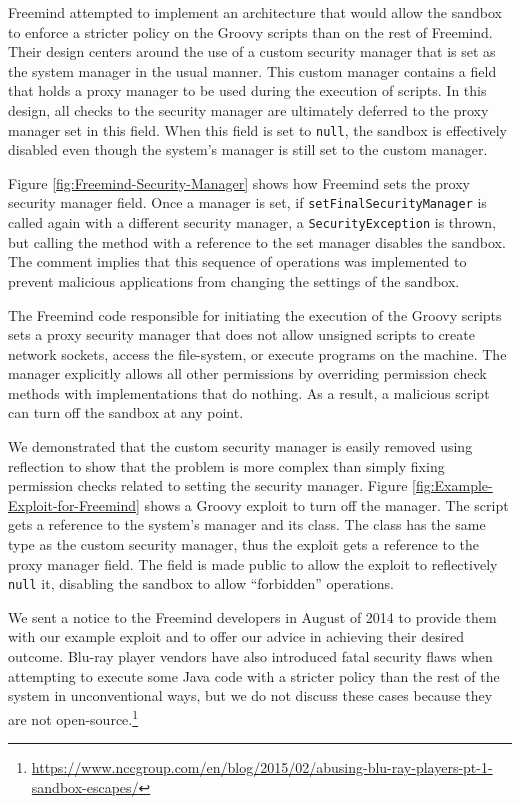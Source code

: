 \documentclass{sig-alternate}
\begin{document}
Freemind attempted to implement an architecture that would allow the
sandbox to enforce a stricter policy on the Groovy scripts than on
the rest of Freemind. Their design centers around the use of a custom
security manager that is set as the system manager in the usual manner.
This custom manager contains a field that holds a proxy manager to be used during the execution of
scripts. In this design, all checks to the security manager are ultimately
deferred to the proxy manager set in this field. When
this field is set to \texttt{null}, the sandbox is effectively disabled
even though the system's manager is still set to the custom manager.

Figure \ref{fig:Freemind-Security-Manager} shows how Freemind sets
the proxy security manager field.
Once a manager is set, if \texttt{setFinalSecurityManager} is called
again with a different security manager, a \texttt{SecurityException}
is thrown, but calling the method with a reference to the set manager disables
the sandbox. The comment implies that this sequence
of operations was implemented to prevent malicious applications from
changing the settings of the sandbox.

The Freemind code responsible for initiating the execution of the
Groovy scripts sets a proxy security manager that does not allow unsigned
scripts to create network sockets, access the file-system, or execute
programs on the machine. The manager explicitly allows all other permissions by overriding permission check methods with implementations that do nothing. As a result, a malicious script can turn off the sandbox at any point.

We demonstrated that the custom security manager is easily removed
using reflection to show that the problem is more complex than simply
fixing permission checks related to setting the security manager. Figure \ref{fig:Example-Exploit-for-Freemind}
shows a Groovy exploit to turn off the manager. The script gets a reference to the system's manager
and its class. The class has the same type as the custom security
manager, thus the exploit gets a reference to the proxy manager field.
The field is made public to allow the exploit to reflectively \texttt{null}
it, disabling the sandbox to allow ``forbidden'' operations.

We sent a notice to the Freemind developers in August of 2014 to provide
them with our example exploit and to offer our advice in achieving
their desired outcome. Blu-ray player vendors have also introduced fatal security flaws when attempting to execute some Java code with a stricter policy than the rest of the system in unconventional ways, but we do not discuss these cases because they are not open-source.\footnote{\url{https://www.nccgroup.com/en/blog/2015/02/abusing-blu-ray-players-pt-1-sandbox-escapes/}}
\end{document}

